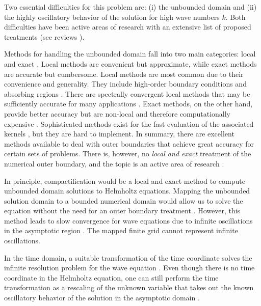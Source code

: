\documentclass[final,onefignum,onetabnum]{siamart190516}
\begin{document}
Two essential difficulties for this problem are: (i) the unbounded domain and (ii) the highly oscillatory behavior of the solution for high wave numbers $k$. Both difficulties have been active areas of research with an extensive list of proposed treatments (see reviews \cite{TSYNKOV1998465, HagstromReview, engquist2003computational}).

Methods for handling the unbounded domain fall into two main categories: local and exact \cite{TSYNKOV1998465, HagstromReview, givoli2013numerical}. Local methods are convenient but approximate, while exact methods are accurate but cumbersome. Local methods are most common due to their convenience and generality. They include high-order boundary conditions \cite{EngquistMajda77, BaylissTurkel80} and absorbing regions \cite{israeli1981approximation, BERENGER1994185}. There are spectrally convergent local methods that may be sufficiently accurate for many applications \cite{hagstrom2009complete}. Exact methods, on the other hand, provide better accuracy but are non-local and therefore computationally expensive \cite{keller1989exact, GROTE1998327, grote1996nonreflecting}. Sophisticated methods exist for the fast evaluation of the associated kernels \cite{alpert2000rapid}, but they are hard to implement. In summary, there are excellent methods available to deal with outer boundaries that achieve great accuracy for certain sets of problems. There is, however, no {\it local and exact} treatment of the numerical outer boundary, and the topic is an active area of research \cite{9196168, kirby2020finite, papadimitropoulos2020double, petropavlovsky2020numerical, duhamel2020computation}.


In principle, compactification would be a local and exact method to compute unbounded domain solutions to Helmholtz equations. Mapping the unbounded solution domain to a bounded numerical domain would allow us to solve the equation without the need for an outer boundary treatment \cite{GroschOrszag77, boyd1982optimization, shen2009some}. However, this method leads to slow convergence for wave equations due to infinite oscillations in the asymptotic region \cite{GroschOrszag77, shen2014approximations}. The mapped finite grid cannot represent infinite oscillations.

In the time domain, a suitable transformation of the time coordinate solves the infinite resolution problem for the wave equation \cite{ZENGINOGLU20112286}. Even though there is no time coordinate in the Helmholtz equation, one can still perform the time transformation as a rescaling of the unknown variable that takes out the known oscillatory behavior of the solution in the asymptotic domain \cite{ZengFramework}.
\end{document}
